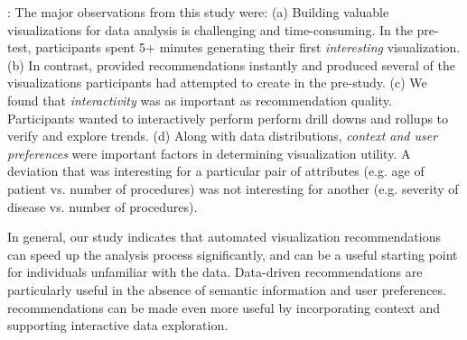 :
The major observations from this study were:
 (a) Building valuable visualizations for data analysis is challenging and time-consuming. In the pre-test, participants spent 5+ minutes generating their first {\it interesting} visualization.
(b) In contrast, \SeeDB provided recommendations instantly and produced several of the visualizations participants had attempted to create in the pre-study.  
(c) We found that {\it interactivity} was as important as recommendation quality. Participants wanted to interactively perform perform drill downs and rollups to verify and explore trends.
(d) Along with data distributions, {\it context and user preferences}  were  important factors in determining visualization utility. A deviation that was interesting for a particular pair of attributes (e.g. age of patient vs. number of procedures) was not interesting for another (e.g. severity of disease vs. number of procedures). 

In general, our study indicates that automated visualization recommendations can speed up the analysis process significantly, and can be a useful starting point for individuals unfamiliar with the data.
Data-driven recommendations are particularly useful in the absence of semantic information and user preferences.
\SeeDB recommendations can be made even more useful by incorporating context and supporting interactive data exploration.


